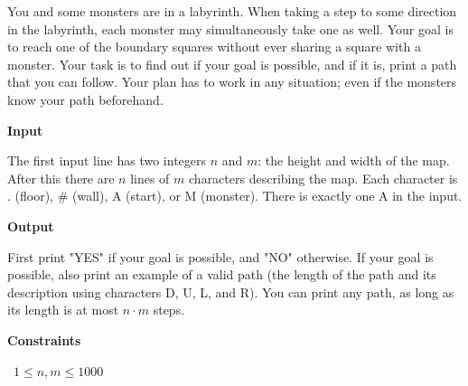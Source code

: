 You and some monsters are in a labyrinth. When taking a step to some direction in the labyrinth, each monster may simultaneously take one as well. Your goal is to reach one of the boundary squares without ever sharing a square with a monster.
Your task is to find out if your goal is possible, and if it is, print a path that you can follow. Your plan has to work in any situation; even if the monsters know your path beforehand.

\vspace{0.3cm}\noindent\textbf{Input}

The first input line has two integers $n$ and $m$: the height and width of the map.
After this there are $n$ lines of $m$ characters describing the map. Each character is . (floor), \# (wall), A (start), or M (monster). There is exactly one A in the input.

\vspace{0.3cm}\noindent\textbf{Output}

First print "YES" if your goal is possible, and "NO" otherwise.
If your goal is possible, also print an example of a valid path (the length of the path and its description using characters D, U, L, and R). You can print any path, as long as its length is at most $n \cdot m$ steps.

\vspace{0.3cm}\noindent\textbf{Constraints}

\textbullet\ $1 \le n,m \le 1000$